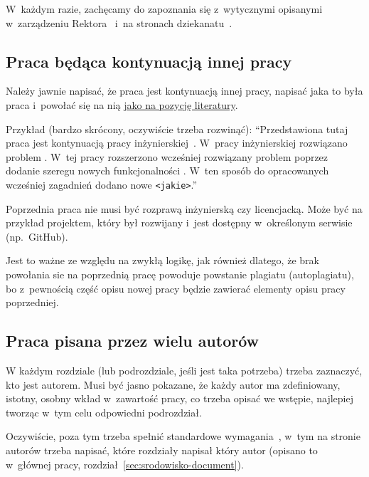 \vspace{2\parsep}

W~każdym razie, zachęcamy do zapoznania się z~wytycznymi opisanymi w~zarządzeniu Rektora~ i~na stronach dziekanatu~.


\subsection{Praca będąca kontynuacją innej pracy}
\label{sec:dod:ogolne-praca-kontynuacja}

Należy jawnie napisać, że praca jest kontynuacją innej pracy, napisać jaka to była praca i~powołać się na nią \hyperref[sec:dod:bibliografia]{jako na pozycję literatury}. 

Przykład (bardzo skrócony, oczywiście trzeba rozwinąć): ``Przedstawiona tutaj praca jest kontynuacją pracy inżynierskiej~. W~pracy inżynierskiej rozwiązano problem {\tt <jaki problem>}. W~tej pracy rozszerzono wcześniej rozwiązany problem poprzez dodanie szeregu nowych funkcjonalności {\tt <jakie to funkcjonalności>}. W~ten sposób do opracowanych wcześniej zagadnień dodano nowe {\tt <jakie>}.''

Poprzednia praca nie musi być rozprawą inżynierską czy licencjacką. Może być na przykład projektem, który był rozwijany i~jest dostępny w~określonym serwisie (np.\ GitHub).

Jest to ważne ze względu na zwykłą logikę, jak również dlatego, że brak powołania sie na poprzednią pracę powoduje powstanie plagiatu (autoplagiatu), bo z~pewnością część opisu nowej pracy będzie zawierać elementy opisu pracy poprzedniej.


\subsection{Praca pisana przez wielu autorów}
\label{sec:dod:ogolne-praca-wieluautorow}

W każdym rozdziale (lub podrozdziale, jeśli jest taka potrzeba) trzeba zaznaczyć, kto jest autorem. Musi być jasno pokazane, że każdy autor ma zdefiniowany, istotny, osobny wkład w~zawartość pracy, co trzeba opisać we wstępie, najlepiej tworząc w~tym celu odpowiedni podrozdział. 

Oczywiście, poza tym trzeba spełnić standardowe wymagania~, w~tym na stronie autorów trzeba napisać, które rozdziały napisał który autor (opisano to w~głównej pracy, rozdział~\ref{sec:srodowisko-document}).


